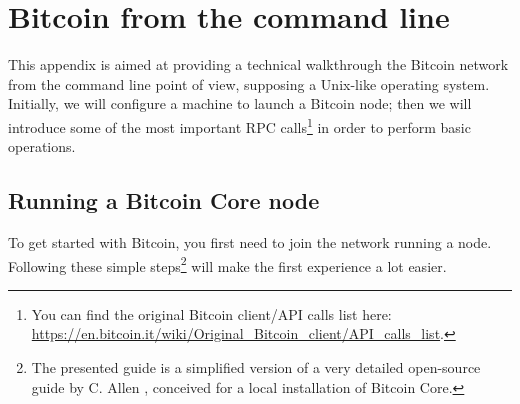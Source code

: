 \chapter{Bitcoin from the command line}
\label{app:A}
This appendix is aimed at providing a technical walkthrough the Bitcoin network from the command line point of view, supposing a Unix-like operating system. Initially, we will configure a machine to launch a Bitcoin node; then we will introduce some of the most important RPC calls\footnote{You can find the original Bitcoin client/API calls list here: \url{https://en.bitcoin.it/wiki/Original_Bitcoin_client/API_calls_list}.} in order to perform basic operations.

\bigskip
\section{Running a Bitcoin Core node}
To get started with Bitcoin, you first need to join the network running a node. Following these simple steps\footnote{The presented guide is a simplified version of a very detailed open-source guide by C. Allen \cite{LearningBitcoinFromTheCommandLine}, conceived for a local installation of Bitcoin Core.} will make the first experience a lot easier.
